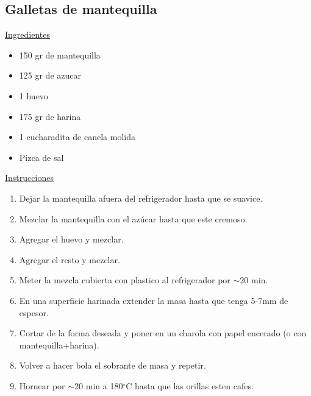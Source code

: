 \subsection{Galletas de mantequilla}
\underline{Ingredientes}
\begin{itemize}
\item 150 gr de mantequilla
\item 125 gr de azucar
\item 1 huevo
\item 175 gr de harina
\item 1 cucharadita de canela molida
\item Pizca de sal
\end{itemize}

\underline{Instrucciones}
\begin{enumerate}
\item Dejar la mantequilla afuera del refrigerador hasta que se suavice. 
\item Mezclar la mantequilla con el az\'ucar hasta que este cremoso.
\item Agregar el huevo y mezclar.
\item Agregar el resto y mezclar.
\item Meter la mezcla cubierta con plastico al refrigerador por $\sim$20 min.
\item En una superficie harinada extender la masa hasta que tenga 5-7mm de espesor.
\item Cortar de la forma deseada y poner en un charola con papel encerado (o con mantequilla+harina).
\item Volver a hacer bola el sobrante de masa y repetir.
\item Hornear por $\sim$20 min a 180$^\circ$C hasta que las orillas esten cafes.
\end{enumerate}
